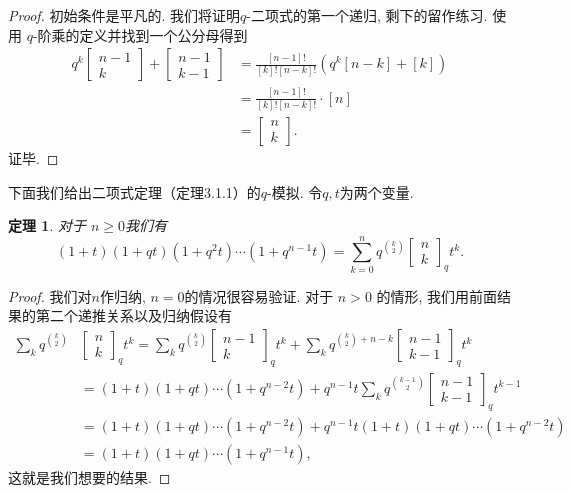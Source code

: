 \documentclass[a4paper,12pt]{ctexbook}
\newtheorem{theorem}[lemma]{\hspace{2em}定理}%
\begin{document}
\begin{proof}
	初始条件是平凡的. 我们将证明$q$-二项式的第一个递归, 剩下的留作练习. 使用 $q$-阶乘的定义并找到一个公分母得到
	$$
	\begin{aligned}
	q^{k}\left[\begin{array}{c}
	n-1 \\
	k
	\end{array}\right]+\left[\begin{array}{c}
	n-1 \\
	k-1
	\end{array}\right] &=\frac{[n-1] !}{[k] ![n-k] !}\left(q^{k}[n-k]+[k]\right) \\
	&=\frac{[n-1] !}{[k] ![n-k] !} \cdot[n] \\
	&=\left[\begin{array}{c}
	n \\
	k
	\end{array}\right].
	\end{aligned}
	$$
	证毕.
\end{proof}

下面我们给出二项式定理（定理3.1.1）的$q$-模拟. 令$q,t$为两个变量.
\begin{theorem}
	对于 $n \geq 0$我们有
	\[
	(1+t)(1+q t)\left(1+q^{2} t\right) \cdots\left(1+q^{n-1} t\right)=\sum_{k=0}^{n}q^{\binom{k}{2}} \left[\begin{array}{l}
	n \\
	k
	\end{array}\right]_{q} t^{k} .\tag{3.6}
	\]
\end{theorem}
\begin{proof}
	我们对$n$作归纳, $n=0$的情况很容易验证. 对于 $n>0$ 的情形, 我们用前面结果的第二个递推关系以及归纳假设有
	$$
	\begin{aligned}
	\sum_{k} q^{\binom{k}{2}} &\left[\begin{array}{l}
	n \\
	k
	\end{array}\right]_{q} t^{k}=\sum_{k} q^{\binom{k}{2}}\left[\begin{array}{c}
	n-1 \\
	k
	\end{array}\right]_{q} t^{k}+\sum_{k} q^{\binom{k}{2}+n-k}\left[\begin{array}{c}
	n-1 \\
	k-1
	\end{array}\right]_{q} t^{k} \\
	&=(1+t)(1+q t) \cdots\left(1+q^{n-2} t\right)+q^{n-1} t \sum_{k} q^{\binom{k-1}{2}}\left[\begin{array}{c}
	n-1 \\
	k-1
	\end{array}\right]_{q} t^{k-1} \\
	&=(1+t)(1+q t) \cdots\left(1+q^{n-2} t\right)+q^{n-1} t(1+t)(1+q t) \cdots\left(1+q^{n-2} t\right) \\
	&=(1+t)(1+q t) \cdots\left(1+q^{n-1} t\right),
	\end{aligned}
	$$这就是我们想要的结果.
\end{proof}
\end{document}
